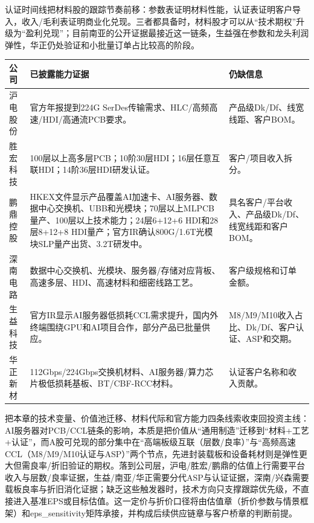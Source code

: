 认证时间线把材料股的跟踪节奏前移：参数表证明材料性能，认证表证明客户导入，收入/毛利表证明商业化兑现。三者都具备时，材料股才可以从“技术期权”升级为“盈利兑现”；目前南亚的公开证据最接近这一链条，生益强在参数和龙头利润弹性，华正仍处验证和小批量订单占比较高的阶段。

\begin{exhibitbox}[图表3-18：已覆盖的官方技术能力]
\footnotesize
\begin{tabularx}{\textwidth}{L{2.0cm}X X}
\toprule
\textbf{公司} & \textbf{已披露能力证据} & \textbf{仍缺信息} \\
\midrule
沪电股份 & 官方年报提到224G SerDes传输需求、HLC/高频高速/HDI/高通流PCB要求。 & 产品级Dk/Df、线宽线距、客户BOM。 \\
胜宏科技 & 100层以上高多层PCB；10阶30层HDI；16层任意互联HDI；14阶36层HDI研发认证。 & 客户/项目收入拆分。 \\
鹏鼎控股 & HKEX文件显示产品覆盖AI加速卡、AI服务器、数据中心交换机、UBB和光模块；70层以上MLPCB量产、100层以上技术能力；24层6+12+6 HDI和28层8+12+8 HDI量产；官方IR确认800G/1.6T光模块SLP量产出货、3.2T研发中。 & 具名客户/平台收入、产品级Dk/Df、线宽线距和客户BOM。 \\
深南电路 & 数据中心交换机、光模块、服务器/存储对应背板、高速多层、HDI、高速材料和细密线路工艺。 & 客户级规格和订单金额。 \\
生益科技 & 官方IR显示AI服务器低损耗CCL需求提升，国内外终端围绕GPU和AI项目合作，部分产品已批量供应。 & M8/M9/M10收入占比、Dk/Df、客户认证、ASP和交期。 \\
华正新材 & 112Gbps/224Gbps交换机材料、AI服务器/算力芯片极低损耗基板、BT/CBF-RCC材料。 & 认证客户名称和收入贡献。 \\
\bottomrule
\end{tabularx}
\end{exhibitbox}

把本章的技术变量、价值池迁移、材料代际和官方能力四条线索收束回投资主线：AI服务器对PCB/CCL链条的影响，本质是把价值从``通用制造''迁移到``材料+工艺+认证''，而A股可兑现的部分集中在``高端板级互联（层数/良率）''与``高频高速CCL（M8/M9/M10认证与ASP）''两个节点，先进封装载板和设备耗材则是弹性更大但需良率/折旧验证的期权。落到公司层，沪电/胜宏/鹏鼎的估值上行需要平台收入与层数/良率证据，生益/南亚/华正需要分代ASP与认证证据，深南/兴森需要载板良率与折旧消化证据；缺乏这些触发器时，技术方向只支撑跟踪优先级，不直接进入基准EPS或目标估值。这一定价与折价口径将由估值章（折价参数与情景框架）和eps\_sensitivity矩阵承接，并构成后续供应链章与客户桥章的判断前提。
